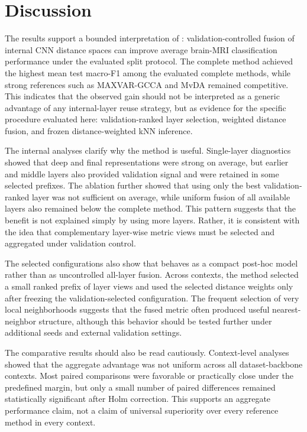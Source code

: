 \documentclass[main.tex]{subfiles}
\begin{document}
\section{Discussion}
\label{sec:discussion}

The results support a bounded interpretation of \method{}: validation-controlled fusion of internal CNN distance spaces can improve average brain-MRI classification performance under the evaluated split protocol. The complete method achieved the highest mean test macro-F1 among the evaluated complete methods, while strong references such as MAXVAR-GCCA and MvDA remained competitive. This indicates that the observed gain should not be interpreted as a generic advantage of any internal-layer reuse strategy, but as evidence for the specific procedure evaluated here: validation-ranked layer selection, weighted distance fusion, and frozen distance-weighted kNN inference.

The internal analyses clarify why the method is useful. Single-layer diagnostics showed that deep and final representations were strong on average, but earlier and middle layers also provided validation signal and were retained in some selected prefixes. The ablation further showed that using only the best validation-ranked layer was not sufficient on average, while uniform fusion of all available layers also remained below the complete method. This pattern suggests that the benefit is not explained simply by using more layers. Rather, it is consistent with the idea that complementary layer-wise metric views must be selected and aggregated under validation control.

The selected configurations also show that \method{} behaves as a compact post-hoc model rather than as uncontrolled all-layer fusion. Across contexts, the method selected a small ranked prefix of layer views and used the selected distance weights only after freezing the validation-selected configuration. The frequent selection of very local neighborhoods suggests that the fused metric often produced useful nearest-neighbor structure, although this behavior should be tested further under additional seeds and external validation settings.

The comparative results should also be read cautiously. Context-level analyses showed that the aggregate advantage was not uniform across all dataset-backbone contexts. Most paired comparisons were favorable or practically close under the predefined margin, but only a small number of paired differences remained statistically significant after Holm correction. This supports an aggregate performance claim, not a claim of universal superiority over every reference method in every context.
\end{document}
